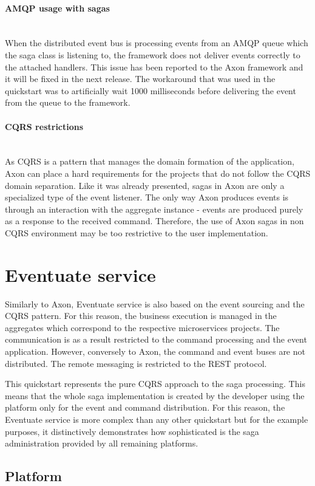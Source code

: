 \documentclass[oneside,
  digital, %
  table,   %
  lof,     %
  lot,     %
]{fithesis3}
\newcommand{\newlinepar}[1]{\paragraph{#1}\needspace{4\baselineskip}\mbox{}\\}
\begin{document}
\newlinepar{AMQP usage with sagas}

When the distributed event bus is processing events from an AMQP queue which the saga class is listening to, the framework does not deliver events correctly to the attached handlers. This issue has been reported to the Axon framework and it will be fixed in the next release. The workaround that was used in the quickstart was to artificially wait 1000 milliseconds before delivering the event from the queue to the framework.

\newlinepar{CQRS restrictions}

As CQRS is a pattern that manages the domain formation of the application, Axon can place a hard requirements for the projects that do not follow the CQRS domain separation. Like it was already presented, sagas in Axon are only a specialized type of the event listener. The only way Axon produces events is through an interaction with the aggregate instance - events are produced purely as a response to the received command. Therefore, the use of Axon sagas in non CQRS environment may be too restrictive to the user implementation.


\section{Eventuate service}

Similarly to Axon, Eventuate service is also based on the event sourcing and the CQRS pattern. For this reason, the business execution is managed in the aggregates which correspond to the respective microservices projects. The communication is as a result restricted to the command processing and the event application. However, conversely to Axon, the command and event buses are not distributed. The remote messaging is restricted to the REST protocol.

This quickstart represents the pure CQRS approach to the saga processing. This means that the whole saga implementation is created by the developer using the platform only for the event and command distribution. For this reason, the Eventuate service is more complex than any other quickstart but for the example purposes, it distinctively demonstrates how sophisticated is the saga administration provided by all remaining platforms.

\subsection{Platform}
\label{sec:eventuate-platform}
\end{document}
